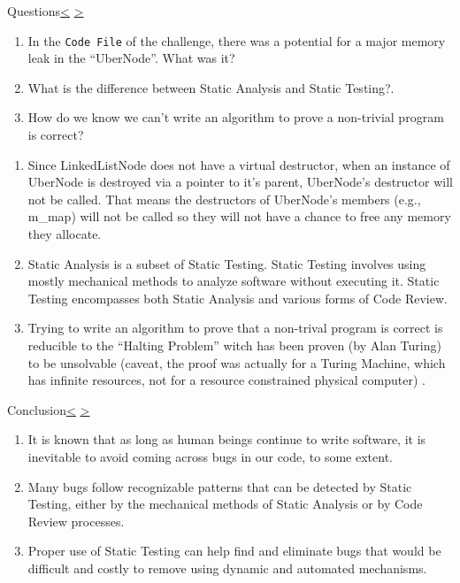 \documentclass[12pt]{extarticle}
\newenvironment{instructionblock}{\Large\bgroup}{\egroup}
\begin{document}
\pagebreak
\begin{slide}{Questions}{\hyperref[slide 18]{\textless} \hyperref[slide 20]{\textgreater}}
	\vskip 10pt
	\begin{instructionblock}
	\begin{enumerate} 
	\item In the \texttt{Code File} of the challenge, there was a potential for a major memory leak in the ``UberNode''.  What was it?
	\item What is the difference between Static Analysis and Static Testing?.
	\item How do we know we can't write an algorithm to prove a non-trivial program is correct?
	\end{enumerate}
	\end{instructionblock}
\end{slide}
\begin{enumerate}
\item Since LinkedListNode does not have a virtual destructor, when an instance of UberNode is destroyed via a pointer to it's parent, UberNode's destructor will not be called.  That means the destructors of UberNode's members (e.g., m\_map) will not be called so they will not have a chance to free any memory they allocate.
\item Static Analysis is a subset of Static Testing.  Static Testing involves using mostly mechanical methods to analyze software without executing it.  Static Testing encompasses both Static Analysis and various forms of Code Review.
\item Trying to write an algorithm to prove that a non-trival program is correct is reducible to the ``Halting Problem'' witch has been proven (by Alan Turing) to be unsolvable (caveat, the proof was actually for a Turing Machine, which has infinite resources, not for a resource constrained physical computer) .
\end{enumerate}




\pagebreak
\begin{slide}{Conclusion}{\hyperref[slide 19]{\textless} \hyperref[slide 21]{\textgreater}}
	\begin{instructionblock}
		\begin{enumerate}
		\item It is known that as long as human beings continue to write software, it is inevitable to avoid coming across bugs in our code, to some extent.
		\item Many bugs follow recognizable patterns that can be detected by Static Testing, either by the mechanical methods of Static Analysis or by Code Review processes.
		\item Proper use of Static Testing can help find and eliminate bugs that would be difficult and costly to remove using dynamic and automated mechanisms.
		\end{enumerate}
	\end{instructionblock}
\end{slide}
\end{document}
